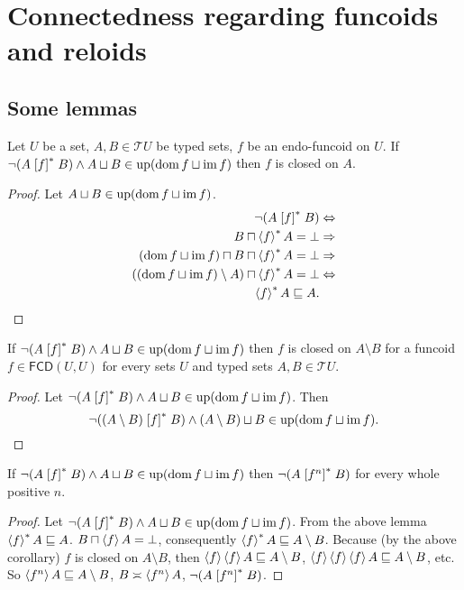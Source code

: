 
\chapter{Connectedness regarding funcoids and reloids}


\section{Some lemmas}
\begin{lem}
Let $U$ be a set, $A,B\in\mathscr{T}U$ be typed sets, $f$ be an
endo-funcoid on $U$. If $\neg(A\mathrel{\left[f\right]^{\ast}}B)\wedge A\sqcup B\in\operatorname{up}(\operatorname{dom} f\sqcup\operatorname{im} f)$
then $f$ is closed on $A$.\end{lem}
\begin{proof}
Let $A\sqcup B\in\operatorname{up}(\operatorname{dom} f\sqcup\operatorname{im} f)$.
\begin{align*}
\lnot(A\mathrel{\left[f\right]^{\ast}}B) & \Leftrightarrow\\
B\sqcap\left\langle f\right\rangle ^{\ast}A=\bot & \Rightarrow\\
(\operatorname{dom} f\sqcup\operatorname{im} f)\sqcap B\sqcap\left\langle f\right\rangle ^{\ast}A=\bot & \Rightarrow\\
((\operatorname{dom} f\sqcup\operatorname{im} f)\setminus A)\sqcap\left\langle f\right\rangle ^{\ast}A=\bot & \Leftrightarrow\\
\left\langle f\right\rangle ^{\ast}A\sqsubseteq A.
\end{align*}
\end{proof}
\begin{cor}
If $\neg(A\mathrel{\left[f\right]^{\ast}}B)\wedge A\sqcup B\in\operatorname{up}(\operatorname{dom} f\sqcup\operatorname{im} f)$ then
$f$ is closed on $A\setminus B$ for a funcoid $f\in\mathsf{FCD}(U,U)$
for every sets $U$ and typed sets $A,B\in\mathscr{T}U$.\end{cor}
\begin{proof}
Let $\neg(A\mathrel{\left[f\right]^{\ast}}B)\wedge A\sqcup B\in\operatorname{up}(\operatorname{dom} f\sqcup\operatorname{im} f)$. Then
\[
\lnot((A\setminus B)\mathrel{\left[f\right]^{\ast}}B)\land(A\setminus B)\sqcup B\in\operatorname{up}(\operatorname{dom} f\sqcup\operatorname{im} f).
\]
\end{proof}
\begin{lem}
If $\neg(A\mathrel{\left[f\right]^{\ast}}B)\wedge A\sqcup B\in\operatorname{up}(\operatorname{dom} f\sqcup\operatorname{im} f)$ then
$\lnot(A\mathrel{\left[f^{n}\right]^{\ast}}B)$ for every whole positive $n$.\end{lem}
\begin{proof}
Let $\neg(A\mathrel{\left[f\right]^{\ast}}B)\wedge A\sqcup B\in\operatorname{up}(\operatorname{dom} f\sqcup\operatorname{im} f)$. From
the above lemma $\left\langle f\right\rangle ^{\ast}A\sqsubseteq A$. $B\sqcap\left\langle f\right\rangle A=\bot$,
consequently $\left\langle f\right\rangle ^{\ast}A\sqsubseteq A\setminus B$. Because (by the
above corollary) $f$ is closed on $A\setminus B$, then $\left\langle f\right\rangle\left\langle f\right\rangle A\sqsubseteq A\setminus B$,
$\left\langle f\right\rangle\left\langle f\right\rangle\left\langle f\right\rangle A\sqsubseteq A\setminus B$, etc. So $\left\langle f^{n}\right\rangle A\sqsubseteq A\setminus B$,
$B\asymp\left\langle f^{n}\right\rangle A$, $\lnot(A\mathrel{\left[f^{n}\right]^{\ast}}B)$.
\end{proof}

